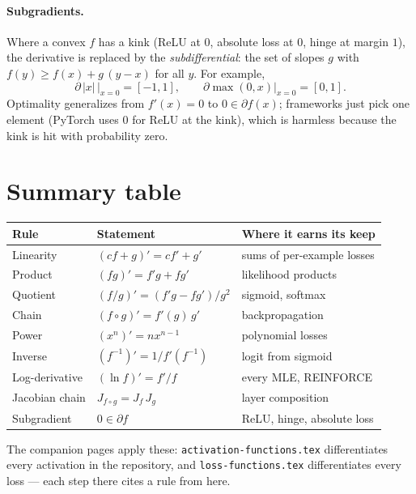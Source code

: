 \documentclass[11pt]{article}
\begin{document}
\paragraph{Subgradients.} Where a convex $f$ has a kink (ReLU at $0$,
absolute loss at $0$, hinge at margin $1$), the derivative is replaced
by the \emph{subdifferential}: the set of slopes $g$ with
$f(y) \ge f(x) + g\,(y - x)$ for all $y$. For example,
\begin{equation}
  \partial\,|x|\,\Big|_{x=0} = [-1, 1],
  \qquad
  \partial \max(0, x)\Big|_{x=0} = [0, 1].
  \label{eq:subgrad}
\end{equation}
Optimality generalizes from $f'(x) = 0$ to $0 \in \partial f(x)$;
frameworks just pick one element (PyTorch uses $0$ for ReLU at the
kink), which is harmless because the kink is hit with probability zero.

\section{Summary table}

\begin{center}
\begin{tabular}{lll}
\toprule
Rule & Statement & Where it earns its keep\\
\midrule
Linearity & $(cf+g)' = cf' + g'$ & sums of per-example losses\\
Product & $(fg)' = f'g + fg'$ & likelihood products\\
Quotient & $(f/g)' = (f'g - fg')/g^2$ & sigmoid, softmax\\
Chain & $(f\circ g)' = f'(g)\,g'$ & backpropagation\\
Power & $(x^n)' = nx^{n-1}$ & polynomial losses\\
Inverse & $(f^{-1})' = 1/f'(f^{-1})$ & logit from sigmoid\\
Log-derivative & $(\ln f)' = f'/f$ & every MLE, REINFORCE\\
Jacobian chain & $J_{f\circ g} = J_f\,J_g$ & layer composition\\
Subgradient & $0 \in \partial f$ & ReLU, hinge, absolute loss\\
\bottomrule
\end{tabular}
\end{center}

\medskip
\noindent
The companion pages apply these: \texttt{activation-functions.tex}
differentiates every activation in the repository, and
\texttt{loss-functions.tex} differentiates every loss --- each step
there cites a rule from here.
\end{document}
